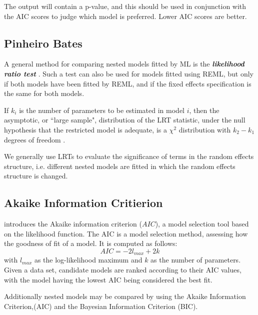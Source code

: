 \documentclass[MAIN.tex]{subfiles}
\begin{document}
The output will contain a p-value, and this should be used in conjunction with the AIC scores to 
judge which model is preferred. Lower AIC scores are better. 


\subsection{Pinheiro Bates}
A general method for comparing nested models fitted by ML is the \textbf{\emph{likelihood ratio test}} \citep{lehmann1986}. Such a test can also be used for models fitted using REML, but only if both models have been fitted by REML, and if the fixed effects specification is the same for both models.

If $k_i$ is the number of parameters to be estimated in model $i$, then the asymptotic, or ``large sample", distribution of the LRT statistic, under the null hypothesis that the restricted model is adequate, is a $\chi^2$ distribution with $k_2-k_1$ degrees of freedom \citep[pg.83]{PB}.

We generally use LRTs to evaluate the significance of terms in the random effects structure, i.e. different nested models are fitted in which the random effects structure is changed.



	\subsection{Akaike Information Critierion}
	\citet{akaike} introduces the Akaike information criterion ($AIC$), a model selection tool based on the likelihood function. The AIC is a model selection method, assessing how the goodness of
	fit of a model. It is computed as follows:
	\begin{displaymath}
	AIC = -2l_{max}+ 2k
	\end{displaymath}
	with $l_{max}$ as the log-likelihood maximum and $k$ as the number
	of parameters. Given a data set, candidate models are ranked according to their AIC values, with the model having the lowest AIC being considered the best fit.
	
	
	Additionally nested models may be compared by using the Akaike Information Criterion,(AIC) and the Bayesian Information Criterion (BIC).
	
	
\end{document}
